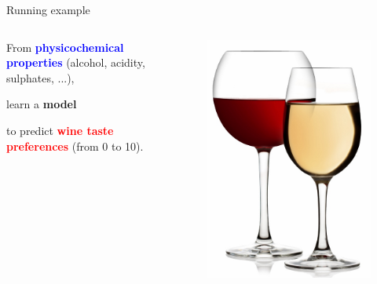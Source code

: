 \documentclass{beamer}
\newcommand{\X}[1]{\textcolor{blue}{#1}}
\newcommand{\y}[1]{\textcolor{red}{#1}}
\newcommand{\model}[1]{\textcolor{mygreen}{#1}}
\begin{document}
\begin{frame}{Running example}

\begin{columns}
\begin{column}{0.5\textwidth}

\begin{center}
From {\bf \X{physicochemical properties}} (alcohol, acidity, sulphates, ...),

\vspace{1cm}

learn a {\bf \model{model}}

\vspace{1cm}

to predict {\bf \y{wine taste preferences}} (from 0 to 10).

\end{center}

\end{column}
\begin{column}{0.5\textwidth}
  \begin{figure}
  \vspace{-0.5cm}
  \includegraphics[scale=0.6]{./figures/wine.jpg}
  \end{figure}
\end{column}
\end{columns}


\end{frame}
\end{document}
